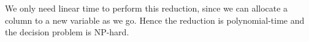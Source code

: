 \documentclass{article}
\begin{document}
\begin{enumerate}[leftmargin={*}, font={\bf}, label={\arabic*.}, ref={\arabic*}]
    We only need linear time to perform this reduction, since we can allocate a column to a new
    variable as we go. Hence the reduction is polynomial-time and the decision problem is NP-hard.
\end{enumerate}
\end{document}
